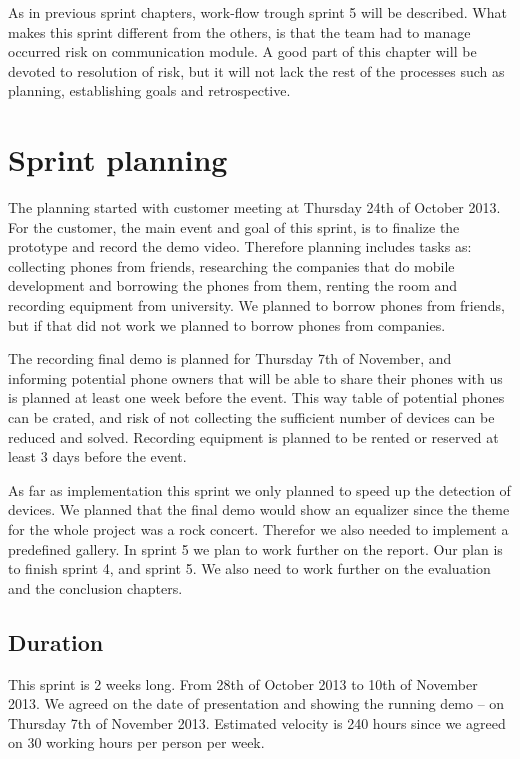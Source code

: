 As in previous sprint chapters, work-flow trough sprint 5 will be described. What makes this sprint different from the others, is that the team had to manage occurred risk on communication module. A good part of this chapter will be devoted to resolution of risk, but it will not lack the rest of the processes such as planning, establishing goals and retrospective.

\section{Sprint planning}

The planning started with customer meeting at Thursday 24th of October 2013. For the customer, the main event and goal of this sprint, is to finalize the prototype and record the demo video. Therefore planning includes tasks as: collecting phones from friends, researching the companies that do mobile development and borrowing the phones from them, renting the room and recording equipment from university. We planned to borrow phones from friends, but if that did not work we planned to borrow phones from companies.

 The recording final demo is planned for Thursday 7th of November, and informing potential phone owners that will be able to share their phones with us is planned at least one week before the event. This way table of potential phones can be crated, and risk of not collecting the sufficient number of devices can be reduced and solved. Recording equipment is planned to be rented or reserved at least 3 days before the event.

As far as implementation this sprint we only planned to speed up the detection of devices. We planned that the final demo would show an equalizer since the theme for the whole project was a rock concert. Therefor we also needed to implement a predefined gallery.
In sprint 5 we plan to work further on the report. Our plan is to finish sprint 4, and sprint 5. We also need to work further on the evaluation and the conclusion chapters.  

\subsection{Duration}
This sprint is 2 weeks long. From 28th of October 2013 to 10th of November 2013. We agreed
on the date of presentation and showing the running demo – on Thursday 7th of November 2013.
Estimated velocity is 240 hours since we agreed on 30 working hours per person per week. 

